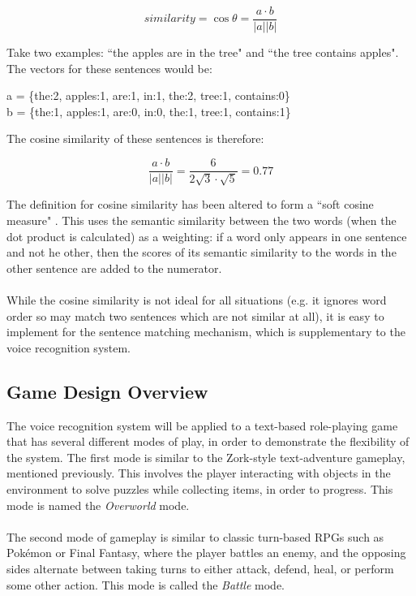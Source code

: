 \documentclass[11pt]{article}
\begin{document}
$$similarity = \cos \theta = \frac{a \cdot b}{\lvert a\rvert\lvert b\rvert}$$

Take two examples: ``the apples are in the tree" and ``the tree contains apples". The vectors for these sentences would be:

\begin{center}
a = \{the:2, apples:1, are:1, in:1, the:2, tree:1, contains:0\}
\\
b = \{the:1, apples:1, are:0, in:0, the:1, tree:1, contains:1\}
\end{center}

The cosine similarity of these sentences is therefore:

$$\frac{a \cdot b}{\lvert a\rvert\lvert b\rvert} = \frac{6}{2\sqrt{3} \cdot \sqrt{5}} = 0.77$$

The definition for cosine similarity has been altered to form a ``soft cosine measure" \cite{RefWorks:120}. This uses the semantic similarity between the two words (when the dot product is calculated) as a weighting: if a word only appears in one sentence and not he other, then the scores of its semantic similarity to the words in the other sentence are added to the numerator.
\\
\\
While the cosine similarity is not ideal for all situations (e.g. it ignores word order so may match two sentences which are not similar at all), it is easy to implement for the sentence matching mechanism, which is supplementary to the voice recognition system.

\subsection{Game Design Overview}

The voice recognition system will be applied to a text-based role-playing game that has several different modes of play, in order to demonstrate the flexibility of the system. The first mode is similar to the Zork-style text-adventure gameplay, mentioned previously. This involves the player interacting with objects in the environment to solve puzzles while collecting items, in order to progress. This mode is named the \textit{Overworld} mode.
\\
\\
The second mode of gameplay is similar to classic turn-based RPGs such as Pok\'emon or Final Fantasy, where the player battles an enemy, and the opposing sides alternate between taking turns to either attack, defend, heal, or perform some other action. This mode is called the \textit{Battle} mode.
\end{document}
